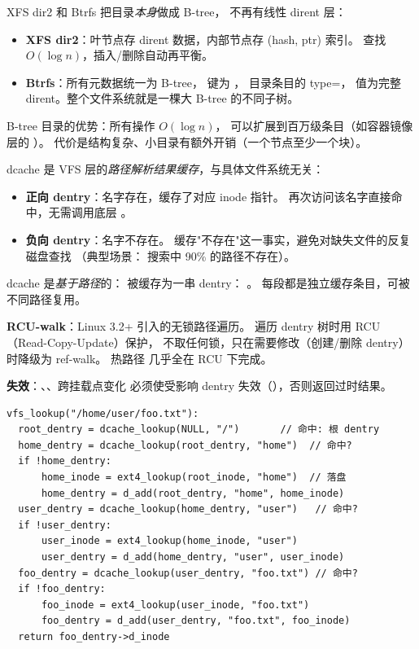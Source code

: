 \begin{filesystemlayout}

XFS dir2 和 Btrfs 把目录\emph{本身}做成 B-tree，
不再有线性 dirent 层：

\begin{itemize}\tightlist
\item \textbf{XFS dir2}：叶节点存 dirent 数据，内部节点存 (hash, ptr) 索引。
  查找 $O(\log n)$，插入/删除自动再平衡。
\item \textbf{Btrfs}：所有元数据统一为 B-tree，
  键为 ，
  目录条目的 type=，
  值为完整 dirent。整个文件系统就是一棵大 B-tree 的不同子树。
\end{itemize}

B-tree 目录的优势：所有操作 $O(\log n)$，
可以扩展到百万级条目（如容器镜像层的 ）。
代价是结构复杂、小目录有额外开销（一个节点至少一个块）。


dcache 是 VFS 层的\emph{路径解析结果缓存}，与具体文件系统无关：

\begin{itemize}\tightlist
\item \textbf{正向 dentry}：名字存在，缓存了对应 inode 指针。
  再次访问该名字直接命中，无需调用底层 。
\item \textbf{负向 dentry}：名字不存在。
  缓存"不存在"这一事实，避免对缺失文件的反复磁盘查找
  （典型场景： 搜索中 90\% 的路径不存在）。
\end{itemize}

dcache 是\emph{基于路径}的： 被缓存为一串 dentry：
。
每段都是独立缓存条目，可被不同路径复用。

\textbf{RCU-walk}：Linux 3.2+ 引入的无锁路径遍历。
遍历 dentry 树时用 RCU（Read-Copy-Update）保护，
不取任何锁，只在需要修改（创建/删除 dentry）时降级为 ref-walk。
热路径  几乎全在 RCU 下完成。

\textbf{失效}：、、跨挂载点变化
必须使受影响 dentry 失效（），否则返回过时结果。


\begin{lstlisting}
vfs_lookup("/home/user/foo.txt"):
  root_dentry = dcache_lookup(NULL, "/")       // 命中: 根 dentry
  home_dentry = dcache_lookup(root_dentry, "home")  // 命中?
  if !home_dentry:
      home_inode = ext4_lookup(root_inode, "home")  // 落盘
      home_dentry = d_add(root_dentry, "home", home_inode)
  user_dentry = dcache_lookup(home_dentry, "user")   // 命中?
  if !user_dentry:
      user_inode = ext4_lookup(home_inode, "user")
      user_dentry = d_add(home_dentry, "user", user_inode)
  foo_dentry = dcache_lookup(user_dentry, "foo.txt") // 命中?
  if !foo_dentry:
      foo_inode = ext4_lookup(user_inode, "foo.txt")
      foo_dentry = d_add(user_dentry, "foo.txt", foo_inode)
  return foo_dentry->d_inode
\end{lstlisting}


\end{filesystemlayout}
